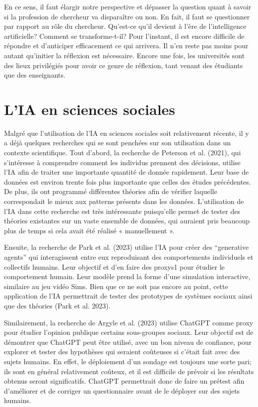 \documentclass[
  letterpaper,
]{scrbook}
\begin{document}
En ce sens, il faut élargir notre perspective et dépasser la question
quant à savoir si la profession de chercheur va disparaître ou non. En
fait, il faut se questionner par rapport au rôle du chercheur. Qu'est-ce
qu'il devient à l'ère de l'intelligence artificielle? Comment se
transforme-t-il? Pour l'instant, il est encore difficile de répondre et
d'anticiper efficacement ce qui arrivera. Il n'en reste pas moins pour
autant qu'initier la réflexion est nécessaire. Encore une fois, les
universités sont des lieux privilégiés pour avoir ce genre de réflexion,
tant venant des étudiants que des enseignants.

\hypertarget{lia-en-sciences-sociales}{%
\section{L'IA en sciences sociales}\label{lia-en-sciences-sociales}}

Malgré que l'utilisation de l'IA en sciences sociales soit relativement
récente, il y a déjà quelques recherches qui se sont penchées sur son
utilisation dans un contexte scientifique. Tout d'abord, la recherche de
Peterson et al. (2021), qui s'intéresse à comprendre comment les
individus prennent des décisions, utilise l'IA afin de traiter une
importante quantité de donnée rapidement. Leur base de données est
environ trente fois plus importante que celles des études précédentes.
De plus, ils ont programmé différentes théories afin de vérifier
laquelle correspondait le mieux aux patterns présents dans les données.
L'utilisation de l'IA dans cette recherche est très intéressante
puisqu'elle permet de tester des théories existantes sur un vaste
ensemble de données, qui auraient pris beaucoup plus de temps si cela
avait été réalisé « manuellement ».

Ensuite, la recherche de Park et al. (2023) utilise l'IA pour créer des
``generative agents'' qui interagissent entre eux reproduisant des
comportements individuels et collectifs humains. Leur objectif et d'en
faire des proxys1 pour étudier le comportement humain. Leur modèle prend
la forme d'une simulation interactive, similaire au jeu vidéo Sims. Bien
que ce ne soit pas encore au point, cette application de l'IA
permettrait de tester des prototypes de systèmes sociaux ainsi que des
théories (Park et al. 2023).

Similairement, la recherche de Argyle et al. (2023) utilise ChatGPT
comme proxy pour étudier l'opinion publique certains sous-groupes
sociaux. Leur objectif est de démontrer que ChatGPT peut être utilisé,
avec un bon niveau de confiance, pour explorer et tester des hypothèses
qui seraient coûteuses si c'était fait avec des sujets humains. En
effet, le déploiement d'un sondage est toujours une sorte pari; ils sont
en général relativement coûteux, et il est difficile de prévoir si les
résultats obtenus seront significatifs. ChatGPT permettrait donc de
faire un prétest afin d'améliorer et de corriger un questionnaire avant
de le déployer sur des sujets humains.
\end{document}
